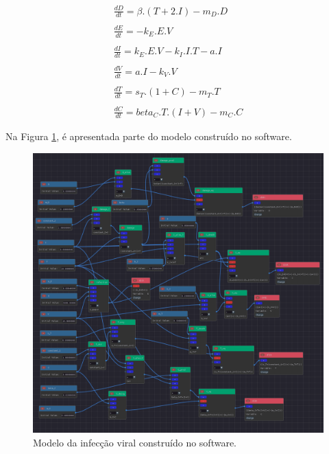\documentclass[
	12pt,				%
	openright,			%
	oneside,			%
	a4paper,			%
	main=brazil,
	english,			%
	]{ufsj-abntex2}
\begin{document}
\begin{equation}
    \begin{array}{lr}
        \frac{dD}{dt} = \beta.(T + 2.I) - m_D.D
        \\
        \\
        \frac{dE}{dt} = - k_E.E.V 
        \\
        \\
        \frac{dI}{dt} = k_E.E.V - k_I.I.T - a.I
        \\
        \\
        \frac{dV}{dt} = a.I - k_V.V
        \\
        \\
        \frac{dT}{dt} = s_T.(1+C)  - m_T.T
        \\
        \\
        \frac{dC}{dt} = beta_C.T.(I + V) - m_C.C
    \end{array}
\end{equation}

Na Figura \ref{fig:infeccaoviral}, é apresentada parte do modelo construído no software.

\begin{figure}[h]
    \centering
    \includegraphics[width=\textwidth]{imgs/modelos/infeccaoviral.png} 
    \caption{Modelo da infecção viral construído no software.}
    \label{fig:infeccaoviral}
\end{figure}
\end{document}
